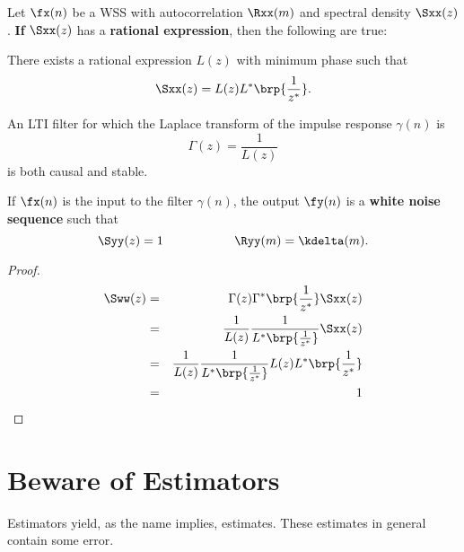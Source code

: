 \begin{theorem}
\label{thm:d-innovations}
Let $\fx(n)$ be a WSS  with autocorrelation $\Rxx(m)$
and spectral density $\Sxx(z)$.
\textbf{If} $\Sxx(z)$ has a \textbf{rational expression},
then the following are true:

\begin{enume}
   \item There exists a rational expression $L(z)$ with minimum phase
         such that
         \[ \Sxx(z) = L(z)L^\ast\brp{\frac{1}{z^\ast}}. \]
   \item An LTI filter for which the Laplace transform of
         the impulse response $\gamma(n)$ is
         \[ \Gamma(z) = \frac{1}{L(z)} \]
         is both causal and stable.
   \item If $\fx(n)$ is the input to the filter $\gamma(n)$,
         the output $\fy(n)$ is a \textbf{white noise sequence} such that
         \[ \Syy(z)=1 \hspace{2cm} \Ryy(m)=\kdelta(m).\]
\end{enume}
\end{theorem}


\begin{proof}
\begin{eqnarray*}
   \Sww(z)
     &=& \Gamma(z)\Gamma^\ast\brp{\frac{1}{z^\ast}} \Sxx(z)
   \\&=& \frac{1}{L(z)} \frac{1}{L^\ast\brp{\frac{1}{z^\ast}}} \Sxx(z)
   \\&=& \frac{1}{L(z)} \frac{1}{L^\ast\brp{\frac{1}{z^\ast}}}
         L(z) L^\ast\brp{\frac{1}{z^\ast}}
   \\&=& 1
\end{eqnarray*}
\end{proof}



\section{Beware of Estimators}
Estimators yield, as the name implies, estimates.
These estimates in general contain some error.

